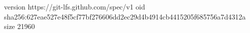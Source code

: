 version https://git-lfs.github.com/spec/v1
oid sha256:627eae527e48f5cf77bf276606dd2ec29d4b4914cb4415205f685756a7d4312a
size 21960
